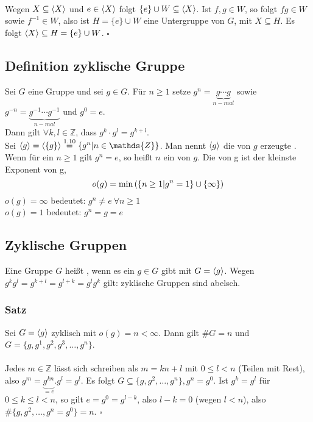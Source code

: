 \\
Wegen $X\subseteq \langle X \rangle$ und $e\in \langle X \rangle$ folgt $\{e\}\cup W\subseteq \langle X \rangle$. Ist $f,g\in W$, so folgt $fg\in W$ sowie $f^{-1}\in W$, also ist $H=\{e\}\cup W$ eine Untergruppe von $G$, mit $X\subseteq H$. Es folgt $\langle X \rangle\subseteq H=\{e\}\cup W$.
\hfill $\square$

\subsection{Definition zyklische Gruppe}
\label{sub:def_zyklische_gruppen}
Sei $G$ eine Gruppe und sei $g\in G$. Für $n\ge 1$ setze $g^n=\underbrace{g\cdots g}_{n-mal}$ sowie $g^{-n}=\underbrace{g^{-1}\cdots g^{-1}}_{n-mal}$ und $g^0=e$.\\
Dann gilt $\forall k,l\in \mathds{Z}$, dass $g^k\cdot g^l = g^{k+l}$.\\
Sei $\lh{g}=\lh{\{g\}}\stackrel{1.10}{=}\{g^n | n\in \mathds{Z}\}$. Man nennt $\langle g \rangle$ die von $g$ erzeugte . Wenn für ein $n\ge 1$ gilt $g^n=e$, so heißt $n$ ein  von $g$. Die  von g ist der kleinste Exponent von g,
\[o(g)=\min\left( \{n\ge 1 | g^n=1\}\cup \{\infty\}\right)\]
$o(g)=\infty$ bedeutet: $g^n\not= e~\forall n\ge 1$\\
$o(g)=1$ bedeutet: $g^n=g=e$

\subsection{Zyklische Gruppen}
\label{sub:zyklische_gruppen}
Eine Gruppe $G$ heißt , wenn es ein $g\in G$ gibt mit $G=\langle g \rangle$. Wegen $g^kg^l=g^{k+l}=g^{l+k}=g^lg^k$ gilt: zyklische Gruppen sind abelsch.

\subsubsection*{Satz}
Sei $G=\langle g \rangle$ zyklisch mit $o(g)=n<\infty$. Dann gilt $\#G=n$ und $G=\{g,g^1,g^2,g^3,\dots,g^n\}$.\\

\\
Jedes $m\in \mathds{Z}$ lässt sich schreiben als $m=kn+l$ mit $0\le l<n$ (Teilen mit Rest), also $g^m= \underbrace{g^{kn}}_{=e}.g^l=g^l$. Es folgt $G\subseteq \{g,g^2,\dots,g^n\}, g^n=g^0$.
Ist $g^k=g^l$ für $0\le k\le l<n$, so gilt $e=g^0=g^{l-k}$, also $l-k=0$ (wegen $l<n$), also $\#\{g,g^2,\dots,g^n=g^0\}=n$.
\hfill $\square$

